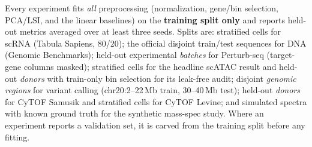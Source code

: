 \documentclass[10pt,twocolumn]{article}
\begin{document}
Every experiment fits \emph{all} preprocessing (normalization, gene/bin selection,
PCA/LSI, and the linear baselines) on the \textbf{training split only} and reports held-out
metrics averaged over at least three seeds. Splits are: stratified cells for scRNA (Tabula
Sapiens, 80/20); the official disjoint train/test sequences for DNA (Genomic Benchmarks);
held-out experimental \emph{batches} for Perturb-seq (target-gene columns masked); stratified
cells for the headline scATAC result and held-out \emph{donors} with train-only bin selection
for its leak-free audit; disjoint \emph{genomic regions} for variant calling
(chr20:2--22\,Mb train, 30--40\,Mb test); held-out \emph{donors} for CyTOF Samusik and
stratified cells for CyTOF Levine; and simulated spectra with known ground truth for the
synthetic mass-spec study. Where an experiment reports a validation set, it is
carved from the training split before any fitting.

{\small


}
\end{document}
